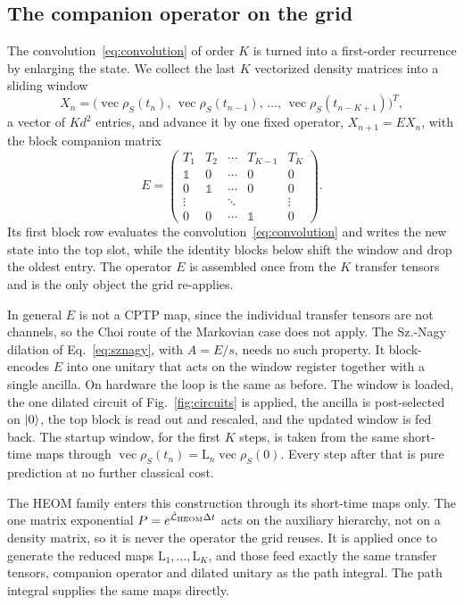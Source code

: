 \documentclass[aps,pra,twocolumn,superscriptaddress,nofootinbib,longbibliography]{revtex4-2}
\DeclareMathOperator{\vecc}{vec}
\newcommand{\id}{\mathds{1}}
\newcommand{\rhoS}{\rho_{S}}
\newcommand{\Ldt}{\mathcal{L}}
\newcommand{\Lmap}{\mathrm{L}}
\newcommand{\dt}{\Delta t}
\begin{document}
\subsection{The companion operator on the grid}
The convolution~\eqref{eq:convolution} of order $K$ is turned into a first-order
recurrence by enlarging the state. We collect the last $K$ vectorized density
matrices into a sliding window
\begin{equation}
  \label{eq:window}
  X_n=\big(\vecc\rhoS(t_n),\,\vecc\rhoS(t_{n-1}),\,\dots,\,
  \vecc\rhoS(t_{n-K+1})\big)^{T},
\end{equation}
a vector of $K d^2$ entries, and advance it by one fixed operator, $X_{n+1}=E
X_n$, with the block companion matrix
\begin{equation}
  \label{eq:companion}
  E=\begin{pmatrix}
  T_1 & T_2 & \cdots & T_{K-1} & T_K\\
  \id & 0 & \cdots & 0 & 0\\
  0 & \id & \cdots & 0 & 0\\
  \vdots & & \ddots & & \vdots\\
  0 & 0 & \cdots & \id & 0
  \end{pmatrix}.
\end{equation}
Its first block row evaluates the convolution~\eqref{eq:convolution} and writes
the new state into the top slot, while the identity blocks below shift the window
and drop the oldest entry. The operator $E$ is assembled once from the $K$
transfer tensors and is the only object the grid re-applies.

In general $E$ is not a CPTP map, since the individual transfer tensors are not
channels, so the Choi route of the Markovian case does not apply. The Sz.-Nagy
dilation of Eq.~\eqref{eq:sznagy}, with $A=E/s$, needs no such property. It
block-encodes $E$ into one unitary that acts on the window register together with
a single ancilla. On hardware the loop is the same as before. The window is
loaded, the one dilated circuit of Fig.~\ref{fig:circuits} is applied, the
ancilla is post-selected on $\ket{0}$, the top block is read out and rescaled,
and the updated window is fed back. The startup window, for the first $K$ steps,
is taken from the same short-time maps through
$\vecc\rhoS(t_n)=\Lmap_n\vecc\rhoS(0)$. Every step after that is pure prediction
at no further classical cost.

The HEOM family enters this construction through its short-time maps only. The
one matrix exponential $P=e^{\hat{\Ldt}_{\rm HEOM}\dt}$ acts on the auxiliary
hierarchy, not on a density matrix, so it is never the operator the grid reuses.
It is applied once to generate the reduced maps $\Lmap_1,\dots,\Lmap_K$, and
those feed exactly the same transfer tensors, companion operator and dilated
unitary as the path integral. The path integral supplies the same maps directly.
\end{document}
